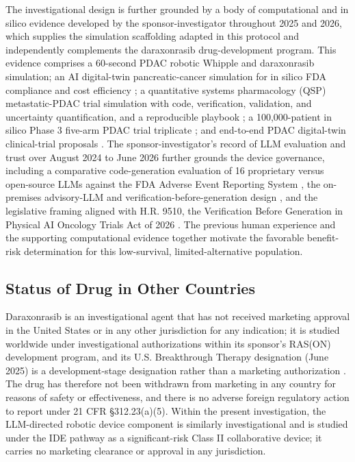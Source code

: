The investigational design is further grounded by a body of computational and
in silico evidence developed by the sponsor-investigator throughout 2025 and 2026,
which supplies the simulation scaffolding adapted in this protocol and independently
complements the daraxonrasib drug-development program. This evidence comprises a
60-second PDAC robotic Whipple and daraxonrasib simulation; an AI digital-twin
pancreatic-cancer simulation for in silico FDA compliance and cost efficiency
\cite{fdadigtwinpc}; a quantitative systems pharmacology (QSP) metastatic-PDAC trial
simulation with code, verification, validation, and uncertainty quantification, and
a reproducible playbook \cite{qspmetpancre}; a 100,000-patient in silico Phase 3
five-arm PDAC trial triplicate \cite{chatgpt100kp}; and end-to-end PDAC digital-twin
clinical-trial proposals \cite{pdacdigtwinp}. The sponsor-investigator's record of
LLM evaluation and trust over August 2024 to June 2026 further grounds the device
governance, including a comparative code-generation evaluation of 16 proprietary
versus open-source LLMs against the FDA Adverse Event Reporting System
\cite{llmcomp16fda}, the on-premises advisory-LLM and verification-before-generation
design \cite{clintrustpai}, and the legislative framing aligned with H.R. 9510, the
Verification Before Generation in Physical AI Oncology Trials Act of 2026
\cite{congress9510}. The previous human experience and the supporting computational
evidence together motivate the favorable benefit-risk determination for this
low-survival, limited-alternative population.

\subsection{Status of Drug in Other Countries}

Daraxonrasib is an investigational agent that has not received marketing approval
in the United States or in any other jurisdiction for any indication; it is studied
worldwide under investigational authorizations within its sponsor's RAS(ON)
development program, and its U.S. Breakthrough Therapy designation (June 2025) is a
development-stage designation rather than a marketing authorization
\cite{daraxwhipple, onpremwhippl}. The drug has therefore not been withdrawn from
marketing in any country for reasons of safety or effectiveness, and there is no
adverse foreign regulatory action to report under 21 CFR \S 312.23(a)(5). Within the
present investigation, the LLM-directed robotic device component is similarly
investigational and is studied under the IDE pathway as a significant-risk Class II
collaborative device; it carries no marketing clearance or approval in any
jurisdiction.

